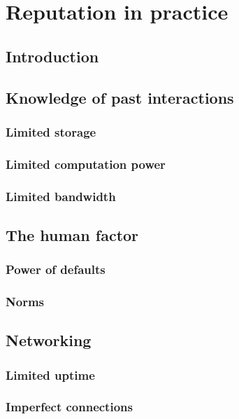 \chapter{Reputation in practice}
\section{Introduction}

\section{Knowledge of past interactions}
\subsection{Limited storage}

\subsection{Limited computation power}

\subsection{Limited bandwidth}

\section{The human factor}
\subsection{Power of defaults}

\subsection{Norms}

\section{Networking}
\subsection{Limited uptime}

\subsection{Imperfect connections}
